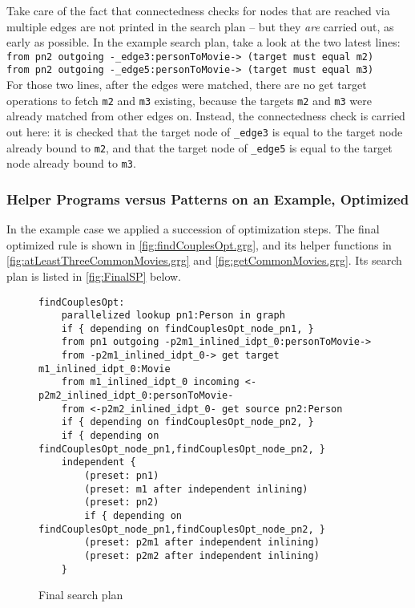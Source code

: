 Take care of the fact that connectedness checks for nodes that are reached via multiple edges are not printed in the search plan -- but they \emph{are} carried out, as early as possible.
In the example search plan, take a look at the two latest lines:\\
\verb#from pn2 outgoing -_edge3:personToMovie-> (target must equal m2)#\\
\verb#from pn2 outgoing -_edge5:personToMovie-> (target must equal m3)#\\
For those two lines, after the edges were matched, there are no get target operations to fetch \texttt{m2} and \texttt{m3} existing, because the targets \texttt{m2} and \texttt{m3} were already matched from other edges on.
Instead, the connectedness check is carried out here:
it is checked that the target node of \verb#_edge3# is equal to the target node already bound to \texttt{m2}, and that the target node of \verb#_edge5# is equal to the target node already bound to \texttt{m3}.

\subsubsection*{Helper Programs versus Patterns on an Example, Optimized}

In the example case \cite{MovieDatabase} we applied a succession of optimization steps.
The final optimized rule is shown in \autoref{fig:findCouplesOpt.grg}, and its helper functions in \autoref{fig:atLeastThreeCommonMovies.grg} and \autoref{fig:getCommonMovies.grg}.
Its search plan is listed in \autoref{fig:FinalSP} below.

\begin{figure}[hptb]
	\begin{verbatim}
findCouplesOpt:
    parallelized lookup pn1:Person in graph
    if { depending on findCouplesOpt_node_pn1, }
    from pn1 outgoing -p2m1_inlined_idpt_0:personToMovie->
    from -p2m1_inlined_idpt_0-> get target m1_inlined_idpt_0:Movie
    from m1_inlined_idpt_0 incoming <-p2m2_inlined_idpt_0:personToMovie-
    from <-p2m2_inlined_idpt_0- get source pn2:Person
    if { depending on findCouplesOpt_node_pn2, }
    if { depending on findCouplesOpt_node_pn1,findCouplesOpt_node_pn2, }
    independent {
        (preset: pn1)
        (preset: m1 after independent inlining)
        (preset: pn2)
        if { depending on findCouplesOpt_node_pn1,findCouplesOpt_node_pn2, }
        (preset: p2m1 after independent inlining)
        (preset: p2m2 after independent inlining)
    }
    \end{verbatim}
	\caption{Final search plan}
	\label{fig:FinalSP}
\end{figure}

